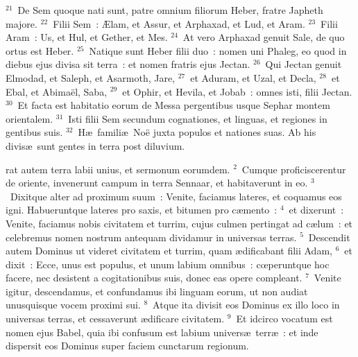 ${}^{21}$~De Sem quoque nati sunt, patre omnium filiorum Heber, fratre Japheth majore.
${}^{22}$~Filii Sem~: \AE lam, et Assur, et Arphaxad, et Lud, et Aram.
${}^{23}$~Filii Aram~: Us, et Hul, et Gether, et Mes.
${}^{24}$~At vero Arphaxad genuit Sale, de quo ortus est Heber.
${}^{25}$~Natique sunt Heber filii duo~: nomen uni Phaleg, eo quod in diebus ejus divisa sit terra~: et nomen fratris ejus Jectan.
${}^{26}$~Qui Jectan genuit Elmodad, et Saleph, et Asarmoth, Jare,
${}^{27}$~et Aduram, et Uzal, et Decla,
${}^{28}$~et Ebal, et Abima\"el, Saba,
${}^{29}$~et Ophir, et Hevila, et Jobab~: omnes isti, filii Jectan.
${}^{30}$~Et facta est habitatio eorum de Messa pergentibus usque Sephar montem orientalem.
${}^{31}$~Isti filii Sem secundum cognationes, et linguas, et regiones in gentibus suis.
${}^{32}$~H\ae\ famili\ae\ No\"e juxta populos et nationes suas. Ab his divis\ae\ sunt gentes in terra post diluvium.

\bchapter
{}rat autem terra labii unius, et sermonum eorumdem.
${}^{2}$~Cumque proficiscerentur de oriente, invenerunt campum in terra Sennaar, et habitaverunt in eo.
${}^{3}$~Dixitque alter ad proximum suum~: Venite, faciamus lateres, et coquamus eos igni. Habueruntque lateres pro saxis, et bitumen pro c\ae mento~:
${}^{4}$~et dixerunt~: Venite, faciamus nobis civitatem et turrim, cujus culmen pertingat ad c\ae lum~: et celebremus nomen nostrum antequam dividamur in universas terras.
${}^{5}$~Descendit autem Dominus ut videret civitatem et turrim, quam \ae dificabant filii Adam,
${}^{6}$~et dixit~: Ecce, unus est populus, et unum labium omnibus~: cœperuntque hoc facere, nec desistent a cogitationibus suis, donec eas opere compleant.
${}^{7}$~Venite igitur, descendamus, et confundamus ibi linguam eorum, ut non audiat unusquisque vocem proximi sui.
${}^{8}$~Atque ita divisit eos Dominus ex illo loco in universas terras, et cessaverunt \ae dificare civitatem.
${}^{9}$~Et idcirco vocatum est nomen ejus Babel, quia ibi confusum est labium univers\ae\ terr\ae~: et inde dispersit eos Dominus super faciem cunctarum regionum.


